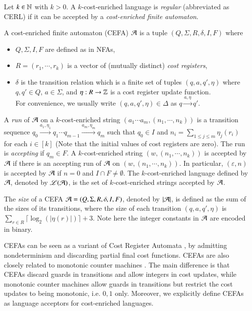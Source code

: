 \begin{definition}
Let $k \in \mathbb{N}$ with $k > 0$. A $k$-cost-enriched language is \emph{regular} (abbreviated as CERL) if it can be accepted by a \emph{cost-enriched finite automaton}. 

A cost-enriched finite automaton (CEFA) $\mathcal{A}$ is a tuple $(Q, \Sigma, R, \delta, I, F)$ where 
\begin{itemize}
\item $Q, \Sigma, I, F$ are defined as in NFAs, 
%
\item $R=(r_1, \cdots, r_k)$ is a vector of (mutually distinct) \emph{cost registers}, 
%
\item $\delta$ is the transition relation which is a finite set of tuples $(q, a, q', \eta)$ where $q, q' \in Q$, $a \in \Sigma$, and %
$\eta: R \rightarrow \mathbb{Z}$
is a cost register update function. \\
For convenience, we usually write $(q, a, q', \eta) \in \Delta$ as $q \xrightarrow{a, \eta} q'$.
\end{itemize}
%
A \emph{run} of $\mathcal{A}$ on a $k$-cost-enriched string $(a_1 \cdots a_m, (n_1, \cdots,n_k))$ is a  transition sequence $q_0 \xrightarrow{a_1, \eta_1} q_1 \cdots q_{m-1} \xrightarrow{a_m, \eta_m} q_m$ such that $q_0 \in I$ and $n_i = \sum \limits_{1\leq j\leq m}\eta_j(r_i)$ for each $i \in [k]$ (Note that the initial values of cost registers are zero). The run is \emph{accepting} if $q_m \in F$. A $k$-cost-enriched string $(w, (n_1, \cdots,n_k))$ is accepted by $\mathcal{A}$ if there is an accepting run of $\mathcal{A}$ on $(w, (n_1, \cdots,n_k))$. In particular, $(\varepsilon, n)$ is accepted by $\mathcal{A}$ if $n=0$ and $I\cap F \neq \emptyset$.
The $k$-cost-enriched language defined by $\mathcal{A}$, denoted by $\mathscr{L}(\mathcal{A})$, is the set of $k$-cost-enriched strings accepted by $\mathcal{A}$. 
\end{definition}
The \emph{size} of a CEFA $\mathcal{A}=(Q, \Sigma, R, \delta, I, F)$, denoted by $|\mathcal{A}|$, is defined as the sum of the sizes of its transitions, where the size of each transition $(q, a, q', \eta)$ is $\sum \limits_{r \in R} \lceil \log_2 (|\eta(r)|) \rceil +3$. Note here  the integer constants in $\mathcal{A}$ are encoded in binary.

\begin{remark}
CEFAs can be seen as a variant of Cost Register Automata \cite{RLJ+13}, by admitting nondeterminism and discarding partial final cost functions. CEFAs are also closely related to monotonic counter machines \cite{LB16}. The main difference is that CEFAs discard guards in transitions and allow integers in cost updates, while monotonic counter machines allow guards in transitions but restrict the cost updates to being monotonic, i.e. $0,1$ only. Moreover, we explicitly define CEFAs as language acceptors for  cost-enriched languages.
\end{remark}

